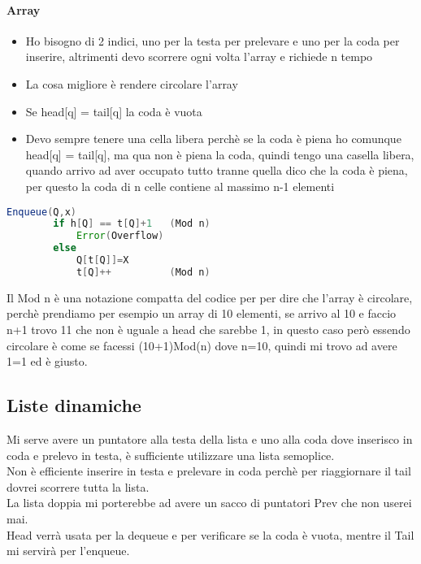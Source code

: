 \paragraph*{Array}  
\begin{itemize}
    \item Ho bisogno di 2 indici, uno per la testa per prelevare e uno per la coda per inserire,
    altrimenti devo scorrere ogni volta l'array e richiede n tempo
    \item La cosa migliore è rendere circolare l'array
    \item Se head[q] = tail[q] la coda è vuota
    \item Devo sempre tenere una cella libera perchè se la coda è piena ho comunque
    head[q] = tail[q], ma qua non è piena la coda, quindi tengo una casella libera, quando arrivo
    ad aver occupato tutto tranne quella dico che la coda è piena, per questo la coda di n celle contiene al
    massimo n-1 elementi 
\end{itemize}
\begin{lstlisting}[language=Java]
    Enqueue(Q,x)
        if h[Q] == t[Q]+1   (Mod n)
            Error(Overflow)
        else
            Q[t[Q]]=X
            t[Q]++          (Mod n)
\end{lstlisting}
Il Mod n è una notazione compatta del codice per per dire che l'array è circolare, perchè prendiamo per esempio
un array di 10 elementi, se arrivo al 10 e faccio n+1 trovo 11 che non è uguale a head che
sarebbe 1, in questo caso però essendo circolare è come se facessi (10+1)Mod(n) dove n=10,
quindi mi trovo ad avere 1=1 ed è giusto.
\subsection{Liste dinamiche}
Mi serve avere un puntatore alla testa della lista e uno alla coda dove inserisco
in coda e prelevo in testa, è sufficiente utilizzare una lista semoplice.\\
Non è efficiente inserire in testa e prelevare in coda perchè per 
riaggiornare il tail dovrei scorrere tutta la lista.\\
La lista doppia mi porterebbe ad avere un sacco di puntatori Prev che non userei mai.\\
Head verrà usata per la dequeue e per verificare se la coda è vuota, mentre il Tail mi servirà
per l'enqueue.

